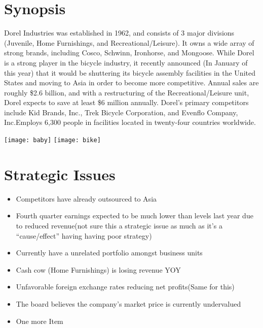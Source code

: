 
\begingroup
\let\clearpage\relax
\let\cleardoublepage\relax
\let\cleardoublepage\relax

\chapter*{Synopsis}
Dorel Industries was established in 1962, and consists of 3 major divisions (Juvenile, Home Furnishings, and Recreational/Leisure)\cite{dorel}.  It owns a wide array of strong brands, including Cosco, Schwinn, Ironhorse, and Mongoose.  While Dorel is a strong player in the bicycle industry, it recently announced (In January of this year) that it would be shuttering its bicycle assembly facilities in the United States and moving to Asia in order to become more competitive.  Annual sales are roughly \$2.6 billion, and with a restructuring of the Recreational/Leisure unit, Dorel expects to save at least \$6 million annually.  Dorel’s primary competitors include Kid Brands, Inc., Trek Bicycle Corporation, and Evenflo Company, Inc.Employs 6,300 people in facilities located in twenty-four countries worldwide.

\vfill
{\texttt{[image: baby]}} 
{\texttt{[image: bike]}} 
\vfill
{}
\chapter*{Strategic Issues}

\begin{itemize}
  \item Competitors have already outsourced to Asia
  \item Fourth quarter earnings expected to be much lower than levels last year due to reduced revenue(not sure this a strategic issue as much as it’s a “cause/effect” having having poor strategy)
  \item Currently have a unrelated portfolio amongst business units
  \item Cash cow (Home Furnishings) is losing revenue YOY
  \item Unfavorable foreign exchange rates reducing net profits(Same for this)
  \item The board believes the company’s market price is currently undervalued
  \item One more Item
\end{itemize}

